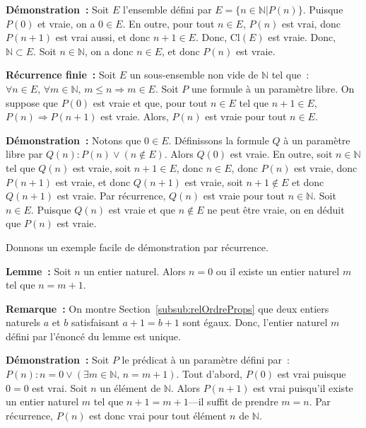 \medskip

\noindent\textbf{Démonstration :} Soit $E$ l'ensemble défini par $E = \lbrace n \in \mathbb{N} \vert P(n) \rbrace$. 
    Puisque $P(0)$ et vraie, on a $0 \in E$. 
    En outre, pour tout $n \in E$, $P(n)$ est vrai, donc $P(n+1)$ est vrai aussi, et donc $n+1 \in E$. 
    Donc, $\mathrm{Cl}(E)$ est vraie. 
    Donc, $\mathbb{N} \subset E$. 
    Soit $n \in \mathbb{N}$, on a donc $n \in E$, et donc $P(n)$ est vraie.

   \done 

\medskip

\noindent\textbf{Récurrence finie :} Soit $E$ un sous-ensemble non vide de $\mathbb{N}$ tel que : $\forall n \in E, \, \forall m \in \mathbb{N}, \, m \leq n \Rightarrow m \in E$. 
    Soit $P$ une formule à un paramètre libre. 
    On suppose que $P(0)$ est vraie et que, pour tout $n \in E$ tel que $n+1 \in E$, $P(n) \Rightarrow P(n+1)$ est vraie. 
    Alors, $P(n)$ est vraie pour tout $n \in E$.

\medskip

\noindent\textbf{Démonstration :} Notons que $0 \in E$. Définissons la formule $Q$ à un paramètre libre par $Q(n): P(n) \vee (n \notin E)$.
    Alors $Q(0)$ est vraie. 
    En outre, soit $n \in \mathbb{N}$ tel que $Q(n)$ est vraie, soit $n+1 \in E$, donc $n \in E$, donc $P(n)$ est vraie, donc $P(n+1)$ est vraie, et donc $Q(n+1)$ est vraie, soit $n+1 \notin E$ et donc $Q(n+1)$ est vraie.
    Par récurrence, $Q(n)$ est vraie pour tout $n \in \mathbb{N}$.
    Soit $n \in E$. 
    Puisque $Q(n)$ est vraie et que $n \notin E$ ne peut être vraie, on en déduit que $P(n)$ est vraie.

   \done 

\medskip

Donnons un exemple facile de démonstration par récurrence. 

\medskip

\noindent\textbf{Lemme :} Soit $n$ un entier naturel. Alors $n=0$ ou il existe un entier naturel $m$ tel que $n=m+1$.

\medskip

\noindent\textbf{Remarque :} On montre Section~\ref{subsub:relOrdreProps} que deux entiers naturels $a$ et $b$ satisfaisant $a+1=b+1$ sont égaux. Donc, l'entier naturel $m$ défini par l'énoncé du lemme est unique. 

\medskip

\noindent\textbf{Démonstration :} Soit $P$ le prédicat à un paramètre défini par : $P(n): n=0 \vee (\exists m \in \mathbb{N}, \, n=m+1)$. 
    Tout d'abord, $P(0)$ est vrai puisque $0=0$ est vrai.
    Soit $n$ un élément de $\mathbb{N}$. 
    Alors $P(n+1)$ est vrai puisqu'il existe un entier naturel $m$ tel que $n+1 = m+1$—il suffit de prendre $m=n$. 
    Par récurrence, $P(n)$ est donc vrai pour tout élément $n$ de $\mathbb{N}$.

